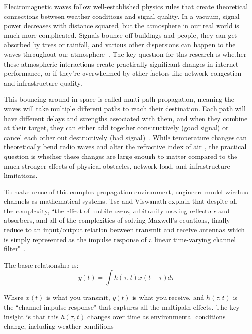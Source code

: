 \documentclass[11pt]{report}
\begin{document}
Electromagnetic waves follow well-established physics rules that create theoretical connections between weather conditions and signal quality. In a vacuum, signal power decreases with distance squared, but the atmosphere in our real world is much more complicated. Signals bounce off buildings and people, they can get absorbed by trees or rainfall, and various other dispersions can happen to the waves throughout our atmosphere~\cite{tse2005fundamentals}. The key question for this research is whether these atmospheric interactions create practically significant changes in internet performance, or if they're overwhelmed by other factors like network congestion and infrastructure quality.

This bouncing around in space is called multi-path propagation, meaning the waves will take multiple different paths to reach their destination. Each path will have different delays and strengths associated with them, and when they combine at their target, they can either add together constructively (good signal) or cancel each other out destructively (bad signal)~\cite{tse2005fundamentals}. While temperature changes can theoretically bend radio waves and alter the refractive index of air~\cite{moraga_weather_radio}, the practical question is whether these changes are large enough to matter compared to the much stronger effects of physical obstacles, network load, and infrastructure limitations.

To make sense of this complex propagation environment, engineers model wireless channels as mathematical systems. Tse and Viswanath explain that despite all the complexity, ``the effect of mobile users, arbitrarily moving reflectors and absorbers, and all of the complexities of solving Maxwell's equations, finally reduce to an input/output relation between transmit and receive antennas which is simply represented as the impulse response of a linear time-varying channel filter"~\cite{tse2005fundamentals}.

The basic relationship is:
\begin{equation}
y(t) = \int h(\tau, t)x(t - \tau)d\tau
\end{equation}

Where $x(t)$ is what you transmit, $y(t)$ is what you receive, and $h(\tau, t)$ is the ``channel impulse response" that captures all the multipath effects. The key insight is that this $h(\tau, t)$ changes over time as environmental conditions change, including weather conditions~\cite{tse2005fundamentals}.
\end{document}
